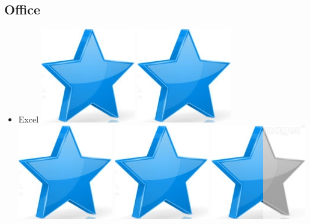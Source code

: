 \documentclass[10pt,a4paper,sans]{article}
\begin{document}
\begin{minipage}[t]{0.28\textwidth}
\begin{mdframed}[style=cadreCompetences]
        \subsection{Office}
            \begin{itemize}
                \item{Excel
                    \hfill
                    \includegraphics[scale=0.25]{img/star.png} \hspace{-0.22cm}
                    \includegraphics[scale=0.25]{img/star.png} \hspace{-0.22cm}
                    \includegraphics[scale=0.25]{img/star.png} \hspace{-0.22cm}
                    \includegraphics[scale=0.25]{img/star.png} \hspace{-0.22cm}
                    \includegraphics[scale=0.25]{img/half_star.png}}

\end{itemize}
\end{mdframed}
\end{minipage}
\end{document}

